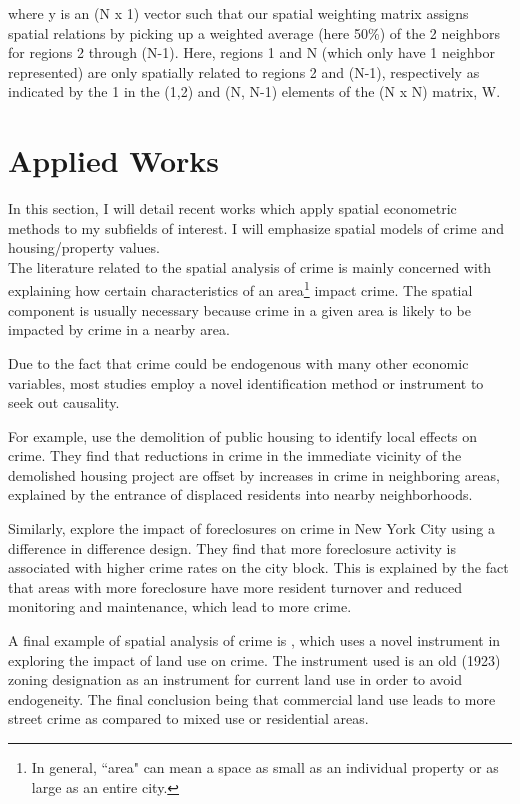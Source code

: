 \documentclass{article}
\begin{document}
where y is an (N x 1) vector such that our spatial weighting matrix assigns spatial relations by picking up a weighted average (here 50\%) of the 2 neighbors for regions 2 through (N-1). Here, regions 1 and N (which only have 1 neighbor represented) are only spatially related to regions 2 and (N-1), respectively as indicated by the 1 in the (1,2) and (N, N-1) elements of the (N x N) matrix, W.

\section{Applied Works}

In this section, I will detail recent works which apply spatial econometric methods to my subfields of interest. I will emphasize spatial models of crime and housing/property values.\\


The literature related to the spatial analysis of crime is mainly concerned with explaining how certain characteristics of an area\footnote{In general, ``area" can mean a space as small as an individual property or as large as an entire city.} impact crime. The spatial component is usually necessary because crime in a given area is likely to be impacted by crime in a nearby area.


Due to the fact that crime could be endogenous with many other economic variables, most studies employ a novel identification  method or instrument to seek out causality.

For example,  use the demolition of public housing to identify local effects on crime. They find that reductions in crime in the immediate vicinity of the demolished housing project are offset by increases in crime in neighboring areas, explained by the entrance of displaced residents into nearby neighborhoods.

Similarly,  explore the impact of foreclosures on crime in New York City using a difference in difference design. They find that more foreclosure activity is associated with higher crime rates on the city block. This is explained by the fact that areas with more foreclosure have more resident turnover and reduced monitoring and maintenance, which lead to more crime.

A final example of spatial analysis of crime is , which uses a novel instrument in exploring the impact of land use on crime. The instrument used is an old (1923) zoning designation as an instrument for current land use in order to avoid endogeneity. The final conclusion being that commercial land use leads to more street crime as compared to mixed use or residential areas.\\
\end{document}
